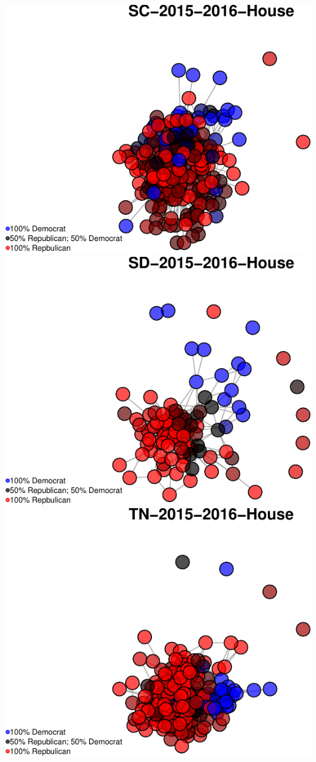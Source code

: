 \documentclass[]{article}
\begin{document}
\includegraphics{Final_Project_RMarkdown_Updated_files/figure-latex/unnamed-chunk-10-34.pdf}
\includegraphics{Final_Project_RMarkdown_Updated_files/figure-latex/unnamed-chunk-10-35.pdf}
\includegraphics{Final_Project_RMarkdown_Updated_files/figure-latex/unnamed-chunk-10-36.pdf}
\end{document}
